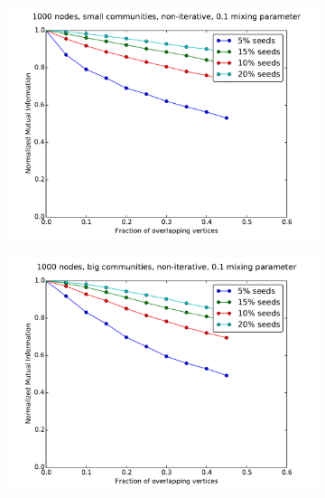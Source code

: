 \begin{figure}
    \centering
    \begin{subfigure}{0.5\textwidth}
    \includegraphics[width=\linewidth]{allplots/overlap_noniter_1mu_a.pdf}
    \end{subfigure}%
    \begin{subfigure}{0.5\textwidth}
    \includegraphics[width=\linewidth]{allplots/overlap_noniter_1mu_b.pdf}
    \end{subfigure}
    \begin{subfigure}{0.5\textwidth}

\end{subfigure}
\end{figure}
